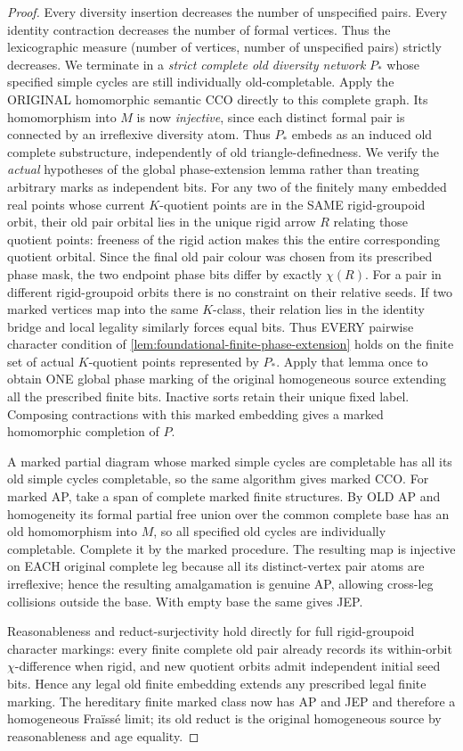 \begin{proof}
Every diversity insertion decreases
the number of unspecified pairs.
Every identity contraction decreases
the number of formal vertices.
Thus the lexicographic measure
(number of vertices, number of
unspecified pairs) strictly decreases.
We terminate in a \emph{strict complete
old diversity network} \(P_*\)
whose specified simple cycles
are still individually old-completable.
Apply the ORIGINAL homomorphic
semantic CCO directly to this
complete graph. Its homomorphism
into \(M\) is now \emph{injective},
since each distinct formal pair
is connected by an irreflexive
diversity atom. Thus \(P_*\)
embeds as an induced old complete
substructure, independently of old
triangle-definedness.
We verify the \emph{actual} hypotheses of
the global phase-extension lemma rather
than treating arbitrary marks as independent
bits. For any two of the finitely many
embedded real points whose current
$K$-quotient points are in the SAME
rigid-groupoid orbit, their old pair
orbital lies in the unique rigid arrow
$R$ relating those quotient points:
freeness of the rigid action makes
this the entire corresponding quotient
orbital. Since the final old pair colour
was chosen from its prescribed phase mask,
the two endpoint phase bits differ by
exactly $\chi(R)$. For a pair in different
rigid-groupoid orbits there is no
constraint on their relative seeds.
If two marked vertices map into the
same $K$-class, their relation lies
in the identity bridge and local
legality similarly forces equal bits.
Thus EVERY pairwise character condition
of \cref{lem:foundational-finite-phase-extension}
holds on the finite set of actual
$K$-quotient points represented by
$P_*$. Apply that lemma once to obtain
ONE global phase marking of the original
homogeneous source extending all the
prescribed finite bits. Inactive sorts
retain their unique fixed label.
Composing contractions with this
marked embedding gives a marked
homomorphic completion of $P$.

A marked partial diagram whose marked
simple cycles are completable has all
its old simple cycles completable, so
the same algorithm gives marked CCO.
For marked AP, take a span of complete
marked finite structures. By OLD AP
and homogeneity its formal partial
free union over the common complete
base has an old homomorphism into \(M\),
so all specified old cycles are
individually completable. Complete it
by the marked procedure. The resulting
map is injective on EACH original
complete leg because all its
distinct-vertex pair atoms are
irreflexive; hence the resulting
amalgamation is genuine AP, allowing
cross-leg collisions outside the base.
With empty base the same gives JEP.

Reasonableness and reduct-surjectivity
hold directly for full rigid-groupoid
character markings: every finite
complete old pair already records
its within-orbit \(\chi\)-difference
when rigid, and new quotient orbits
admit independent initial seed bits.
Hence any legal old finite embedding
extends any prescribed legal finite
marking. The hereditary finite
marked class now has AP and JEP
and therefore a homogeneous Fra\"iss\'e
limit; its old reduct is the original
homogeneous source by reasonableness
and age equality.
\end{proof}

